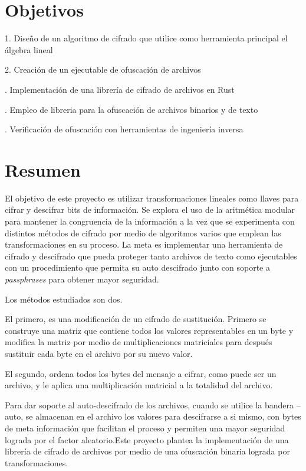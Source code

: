 \documentclass[a4paper]{article}
\begin{document}
\vfill
\newpage

\section{Objetivos}

1. Diseño de un algoritmo de cifrado que utilice como herramienta principal el
álgebra lineal

2. Creación de un ejecutable de ofuscación de archivos

. Implementación de una librería de cifrado de archivos en Rust

. Empleo de libreria para la ofuscación de archivos binarios y de
texto

. Verificación de ofuscación con herramientas de ingeniería inversa

\section{Resumen}

El objetivo de este proyecto es utilizar transformaciones lineales como llaves
para cifrar y descifrar bits de información.
Se explora el uso de la aritmética modular para mantener la congruencia de la
información
 a la vez que se  experimenta con distintos métodos de cifrado por medio de
algoritmos varios que emplean las transformaciones en su proceso.
La meta es implementar una herramienta de cifrado y descifrado que pueda
proteger tanto archivos de texto como ejecutables con un procedimiento
que permita su auto descifrado junto con soporte a \textit{passphrases} para
obtener mayor seguridad.

Los métodos estudiados son dos. 

El primero, es una modificación de un cifrado de sustitución. Primero se
construye una matriz que contiene todos los valores representables en un 
byte y modifica la matriz por medio de multiplicaciones matriciales para
después sustituir cada byte en el archivo por su nuevo valor. 

El segundo, ordena todos los bytes del mensaje a cifrar, como puede ser un
archivo, y le aplica una multiplicación matricial a la totalidad del archivo. 

Para dar soporte al auto-descifrado de los archivos, cuando se utilice la
bandera --auto, se almacenan en el archivo los valores para descifrarse a si
mismo, 
con bytes de meta información que facilitan el proceso y permiten una mayor
seguridad lograda por el factor aleatorio.Este proyecto plantea la
implementación 
de una librería de cifrado de archivos por medio de una ofuscación binaria
lograda por transformaciones.
\end{document}

